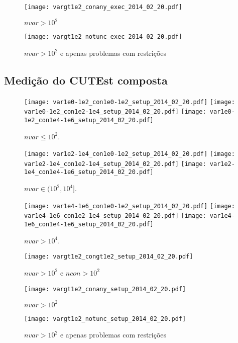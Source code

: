 \documentclass{article}
\begin{document}
\begin{figure}[H]
\centering
\texttt{[image: vargt1e2\_conany\_exec\_2014\_02\_20.pdf]}
\caption{ $nvar > 10^2$ }
\label{fig:nvar_medium_and_big}
\end{figure}

\begin{figure}[H]
\centering
\texttt{[image: vargt1e2\_notunc\_exec\_2014\_02\_20.pdf]}
\caption{ $nvar > 10^2$ e apenas problemas com restrições }
\label{fig:nvar_medium_and_big_not_unc}
\end{figure}

\subsection{Medição do CUTEst composta}

\begin{figure}[H]
\centering
\texttt{[image: var1e0-1e2\_con1e0-1e2\_setup\_2014\_02\_20.pdf]}
\texttt{[image: var1e0-1e2\_con1e2-1e4\_setup\_2014\_02\_20.pdf]}
\texttt{[image: var1e0-1e2\_con1e4-1e6\_setup\_2014\_02\_20.pdf]}
\caption{ $nvar \leq 10^2$. }
\label{fig:nvar_small}
\end{figure}
\begin{figure}[H]
\centering
\texttt{[image: var1e2-1e4\_con1e0-1e2\_setup\_2014\_02\_20.pdf]}
\texttt{[image: var1e2-1e4\_con1e2-1e4\_setup\_2014\_02\_20.pdf]}
\texttt{[image: var1e2-1e4\_con1e4-1e6\_setup\_2014\_02\_20.pdf]}
\caption{ $nvar \in (10^2,10^4]$. }
\label{fig:nvar_medium}
\end{figure}
\begin{figure}[H]
\centering
\texttt{[image: var1e4-1e6\_con1e0-1e2\_setup\_2014\_02\_20.pdf]}
\texttt{[image: var1e4-1e6\_con1e2-1e4\_setup\_2014\_02\_20.pdf]}
\texttt{[image: var1e4-1e6\_con1e4-1e6\_setup\_2014\_02\_20.pdf]}
\caption{ $nvar > 10^4$. }
\label{fig:nvar_big}
\end{figure}

\begin{figure}[H]
\centering
\texttt{[image: vargt1e2\_congt1e2\_setup\_2014\_02\_20.pdf]}
\caption{ $nvar > 10^2$ e $ncon > 10^2$ }
\label{fig:both_medium_and_big}
\end{figure}

\begin{figure}[H]
\centering
\texttt{[image: vargt1e2\_conany\_setup\_2014\_02\_20.pdf]}
\caption{ $nvar > 10^2$ }
\label{fig:nvar_medium_and_big}
\end{figure}

\begin{figure}[H]
\centering
\texttt{[image: vargt1e2\_notunc\_setup\_2014\_02\_20.pdf]}
\caption{ $nvar > 10^2$ e apenas problemas com restrições }
\label{fig:nvar_medium_and_big_not_unc}
\end{figure}
\end{document}
